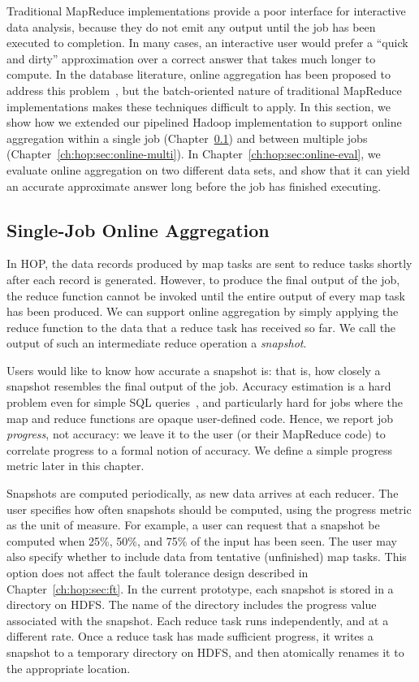 Traditional MapReduce implementations provide a poor interface for interactive
data analysis, because they do not emit any output until the job has been
executed to completion. In many cases, an interactive user would prefer a
``quick and dirty'' approximation over a correct answer that takes much longer
to compute. In the database literature, online aggregation has been proposed to
address this problem~\cite{onlineagg}, but the batch-oriented nature of
traditional MapReduce implementations makes these techniques difficult to
apply. In this section, we show how we extended our pipelined Hadoop
implementation to support online aggregation within a single job
(Chapter~\ref{ch:hop:sec:online-single}) and between multiple jobs
(Chapter~\ref{ch:hop:sec:online-multi}). In Chapter~\ref{ch:hop:sec:online-eval}, we evaluate
online aggregation on two different data sets, and show that it can yield an
accurate approximate answer long before the job has finished executing.

\subsection{Single-Job Online Aggregation}
\label{ch:hop:sec:online-single}

In HOP, the data records produced by map tasks are sent to reduce tasks shortly
after each record is generated. However, to produce the final output of the job,
the reduce function cannot be invoked until the entire output of every map task
has been produced. We can support online aggregation by simply applying the
reduce function to the data that a reduce task has received so far. We call the
output of such an intermediate reduce operation a {\em snapshot}.

Users would like to know how accurate a snapshot is: that is, how closely a
snapshot resembles the final output of the job.  Accuracy estimation is a hard
problem even for simple SQL queries~\cite{dbo}, and particularly hard for jobs
where the map and reduce functions are opaque user-defined code.  Hence, we
report job {\em progress}, not accuracy: we leave it to the user (or their
MapReduce code) to correlate progress to a formal notion of accuracy.  We
define a simple progress metric later in this chapter.

Snapshots are computed periodically, as new data arrives at each reducer. The
user specifies how often snapshots should be computed, using the progress metric
as the unit of measure. For example, a user can request that a snapshot be
computed when 25\%, 50\%, and 75\% of the input has been seen. The user may also
specify whether to include data from tentative (unfinished) map tasks. This
option does not affect the fault tolerance design described in
Chapter~\ref{ch:hop:sec:ft}. In the current prototype, each snapshot is stored in a
directory on HDFS\@. The name of the directory includes the progress value
associated with the snapshot. Each reduce task runs independently, and at a
different rate. Once a reduce task has made sufficient progress, it writes a
snapshot to a temporary directory on HDFS, and then atomically renames it to the
appropriate location.

